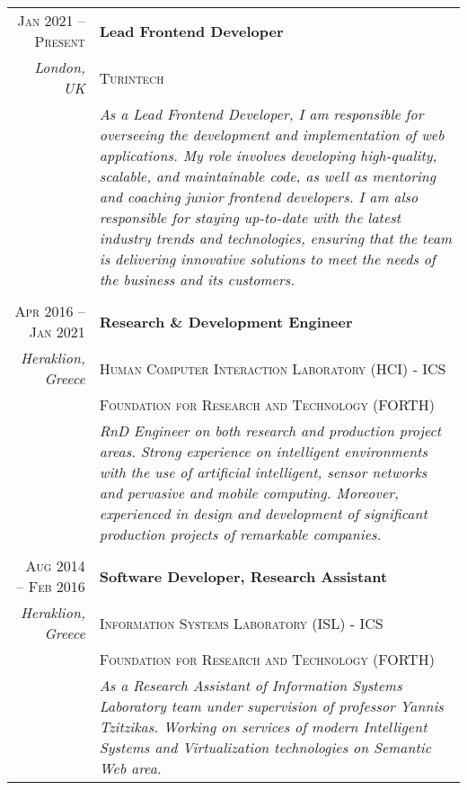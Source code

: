 \documentclass[11pt]{article}
\begin{document}
\begin{longtable}{r|p{12.5cm}}

\textsc{Jan 2021 – Present} & \textbf{Lead Frontend Developer} \\
\footnotesize{\textit{London, UK}} & \textsc{Turintech } \\
& \footnotesize{\textit{As a Lead Frontend Developer, I am responsible for overseeing the development and implementation of web applications. My role involves developing high-quality, scalable, and maintainable code, as well as mentoring and coaching junior frontend developers. I am also responsible for staying up-to-date with the latest industry trends and technologies, ensuring that the team is delivering innovative solutions to meet the needs of the business and its customers.}} \\

\multicolumn{2}{c}{} \\
\textsc{Apr 2016 – Jan 2021} & \textbf{Research \& Development Engineer} \\
\footnotesize{\textit{Heraklion, Greece}} & \textsc{Human Computer Interaction Laboratory (HCI) - ICS } \\
& \textsc{Foundation for Research and Technology (FORTH)} \\
& \footnotesize{\textit{RnD Engineer on both research and production project areas. Strong experience on intelligent environments with the use of artificial intelligent, sensor networks and pervasive and mobile computing. Moreover, experienced in design and development of significant production projects of remarkable companies.}} \\

\multicolumn{2}{c}{} \\
\textsc{Aug 2014 – Feb 2016} & \textbf{Software Developer, Research Assistant} \\
\footnotesize{\textit{Heraklion, Greece}} & \textsc{Information Systems Laboratory (ISL) - ICS } \\
& \textsc{Foundation for Research and Technology (FORTH)} \\
& \footnotesize{\textit{As a Research Assistant of Information Systems Laboratory team under supervision of professor Yannis Tzitzikas. Working on services of modern Intelligent Systems and Virtualization technologies on Semantic Web area.}} \\



\end{longtable}
\end{document}
